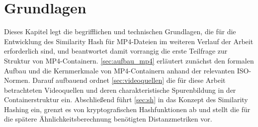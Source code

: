\chapter{Grundlagen}
\label{sec:grundlagen}

Dieses Kapitel legt die begrifflichen und technischen Grundlagen, die für die Entwicklung des Similarity Hash für MP4-Dateien im weiteren Verlauf der Arbeit erforderlich sind, und beantwortet damit vorrangig die erste Teilfrage zur Struktur von MP4-Containern. \cref{sec:aufbau_mp4} erläutert zunächst den formalen Aufbau und die Kernmerkmale von MP4-Containern anhand der relevanten ISO-Normen. Darauf aufbauend ordnet \cref{sec:videoquellen} die für diese Arbeit betrachteten Videoquellen und deren charakteristische Spurenbildung in der Containerstruktur ein. Abschließend führt \cref{sec:sh} in das Konzept des Similarity Hashing ein, grenzt es von kryptografischen Hashfunktionen ab und stellt die für die spätere Ähnlichkeitsberechnung benötigten Distanzmetriken vor.



